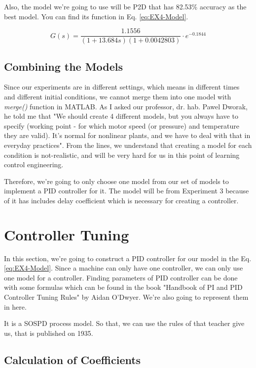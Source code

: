 \documentclass[11pt,a4paper,twocolumn]{article}
\begin{document}
Also, the model we're going to use will be P2D that has 82.53\% accuracy as the best model. You can find its function in Eq. \eqref{eq:EX4-Model}.

\begin{equation}
    G(s) = \frac{1.1556}{(1+13.684s)(1+0.0042803)} \cdot e^{-0.1844}
    \label{eq:EX4-Model}
\end{equation}

\subsection{Combining the Models}
Since our experiments are in different settings, which means in different times and different initial conditions, we cannot merge them into one model with \textit{merge()} function in MATLAB. As I asked our professor, dr. hab. Pawel Dworak, he told me that "We should create 4 different models, but you always have to specify (working point - for which motor speed (or pressure) and temperature they are valid). It's normal for nonlinear plants, and we have to deal with that in everyday practices". From the lines, we understand that creating a model for each condition is not-realistic, and will be very hard for us in this point of learning control engineering.

Therefore, we're going to only choose one model from our set of models to implement a PID controller for it. The model will be from Experiment 3 because of it has includes delay coefficient which is necessary for creating a controller.

\section{Controller Tuning}
\label{sec:controllertunning}
In this section, we're going to construct a PID controller for our model in the Eq. \eqref{eq:EX4-Model}. Since a machine can only have one controller, we can only use one model for a controller. Finding parameters of PID controller can be done with some formulas which can be found in the book "Handbook of PI and PID Controller Tuning Rules" by Aidan O'Dwyer. We're also going to represent them in here.

It is a SOSPD process model. So that, we can use the rules of that teacher give us, that is published on 1935.

\subsection{Calculation of Coefficients}
\end{document}
